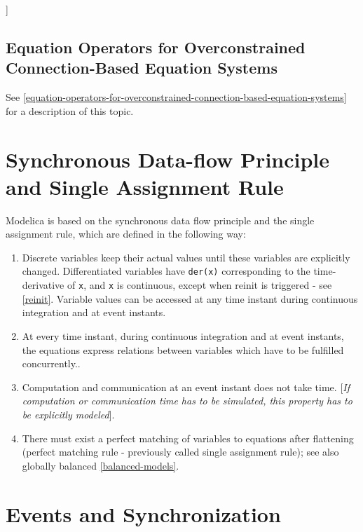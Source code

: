 {]}

\subsection{Equation Operators for Overconstrained Connection-Based Equation Systems}

See \autoref{equation-operators-for-overconstrained-connection-based-equation-systems} for a description of this topic.

\section{Synchronous Data-flow Principle and Single Assignment Rule}

Modelica is based on the synchronous data flow principle and the single
assignment rule, which are defined in the following way:

\begin{enumerate}
\item Discrete variables keep their actual values until these variables are explicitly changed.
Differentiated variables have \lstinline!der(x)! corresponding to the time-derivative of \lstinline!x!,
and \lstinline!x! is continuous, except when reinit is triggered - see \autoref{reinit}.
Variable values can be accessed at any time instant during continuous integration and at event instants.

\item At every time instant, during continuous integration and at event instants,
the equations express relations between variables which have to be fulfilled concurrently..

\item  Computation and communication at an event instant does not take time.
{[}\emph{If computation or communication time has to be simulated, this
property has to be explicitly modeled}{]}.

\item  There must exist a perfect matching of variables to equations after flattening
(perfect matching rule - previously called single assignment rule);
see also globally balanced \autoref{balanced-models}.
\end{enumerate}

\section{Events and Synchronization}

